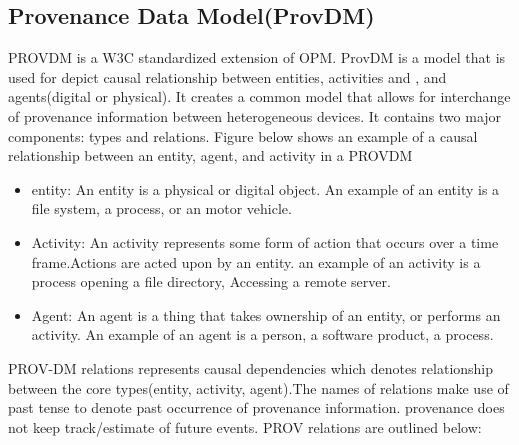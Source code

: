 \subsection{Provenance Data Model(Prov\-DM)}

PROV\-DM is a W3C standardized extension of OPM. Prov\-DM is a model that is used for depict causal relationship between entities, activities and , and agents(digital or physical).  It creates a common model that allows for interchange of provenance information between heterogeneous devices. It contains two major components: types and relations. Figure below shows an example of a causal relationship between an entity, agent, and activity in a PROV\-DM

%
%
\begin{itemize}

\item entity: An entity is a physical or digital object. An example of an entity is a file system, a process, or an motor vehicle.

\item Activity: An activity represents some form of action that occurs over a time frame.Actions are acted upon by an entity. an example of an activity is a process opening a file directory, Accessing a remote server.

\item Agent: An agent is a thing that takes ownership of an entity, or performs an activity. An example of an agent is a person, a software product, a process.
\end{itemize}

PROV-DM relations represents causal dependencies which denotes relationship between the core types(entity, activity, agent).The names of relations make use of past tense to denote past occurrence of provenance information. provenance does not keep track/estimate of future events. PROV relations are outlined below:


